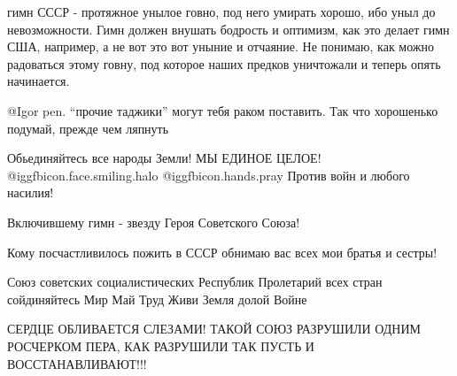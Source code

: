 \begin{itemize}
\begin{itemize}

гимн СССР - протяжное унылое говно, под него умирать хорошо, ибо уныл до
невозможности. Гимн должен внушать бодрость и оптимизм, как это делает гимн
США, например, а не вот это вот уныние и отчаяние. Не понимаю, как можно
радоваться этому говну, под которое наших предков уничтожали и теперь опять
начинается.


@Igor pen.  \enquote{прочие таджики} могут тебя раком поставить. Так что
хорошенько подумай, прежде чем ляпнуть 

\end{itemize} %

Обьединяйтесь все народы Земли! МЫ  ЕДИНОЕ ЦЕЛОЕ!
 @igg{fbicon.face.smiling.halo}  @igg{fbicon.hands.pray} 
Против войн и любого насилия! 

Включившему гимн - звезду Героя Советского Союза!

Кому посчастливилось пожить в СССР обнимаю вас всех мои братья и сестры!


Союз советских социалистических Республик Пролетарий всех стран сойдиняйтесь
Мир Май Труд Живи Земля долой Войне

СЕРДЦЕ ОБЛИВАЕТСЯ СЛЕЗАМИ! ТАКОЙ СОЮЗ РАЗРУШИЛИ ОДНИМ РОСЧЕРКОМ ПЕРА, КАК
РАЗРУШИЛИ ТАК ПУСТЬ И ВОССТАНАВЛИВАЮТ!!! 

\end{itemize} %
